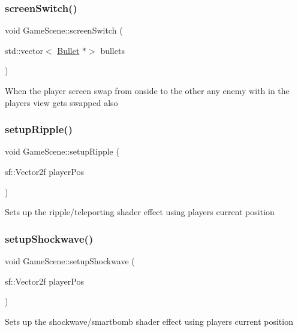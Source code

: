 \subsubsection{\texorpdfstring{screen\+Switch()}{screenSwitch()}}
{\footnotesize\ttfamily void Game\+Scene\+::screen\+Switch (\begin{DoxyParamCaption}\item[{std\+::vector$<$ \hyperlink{class_bullet}{Bullet} $\ast$$>$}]{bullets }\end{DoxyParamCaption})}

When the player screen swap from onside to the other any enemy with in the players view gets swapped also \mbox{\label{class_game_scene_aca0b30f731595929fb7182e2f65941b1}} 
\subsubsection{\texorpdfstring{setup\+Ripple()}{setupRipple()}}
{\footnotesize\ttfamily void Game\+Scene\+::setup\+Ripple (\begin{DoxyParamCaption}\item[{sf\+::\+Vector2f}]{player\+Pos }\end{DoxyParamCaption})}

Sets up the ripple/teleporting shader effect using players current position \mbox{\label{class_game_scene_a67664e1bbce6bec9eda855a9b109d9ec}} 
\subsubsection{\texorpdfstring{setup\+Shockwave()}{setupShockwave()}}
{\footnotesize\ttfamily void Game\+Scene\+::setup\+Shockwave (\begin{DoxyParamCaption}\item[{sf\+::\+Vector2f}]{player\+Pos }\end{DoxyParamCaption})}

Sets up the shockwave/smartbomb shader effect using players current position \mbox{\label{class_game_scene_ae54628d2f041bcad66242584b2db10d6}} 
